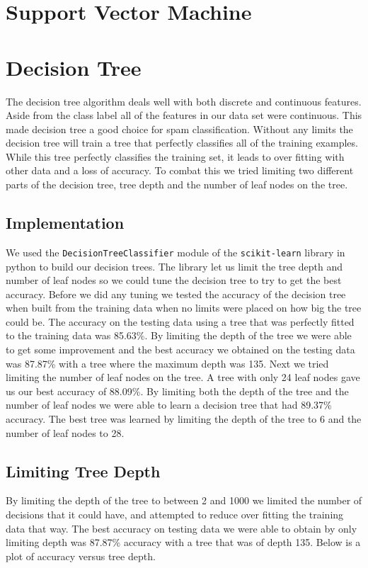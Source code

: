 \documentclass[10pt,letterpaper,onecolumn,draftclsnofoot]{IEEEtran}
\begin{document}
\section{Support Vector Machine}
\section{Decision Tree}
The decision tree algorithm deals well with both discrete and continuous features. Aside from the class label all of the features in our data set were continuous. This made decision tree a good choice for spam classification. Without any limits the decision tree will train a tree that perfectly classifies all of the training examples. While this tree perfectly classifies the training set, it leads to over fitting with other data and a loss of accuracy. To combat this we tried limiting two different parts of the decision tree, tree depth and the number of leaf nodes on the tree.

\subsection{Implementation}
We used the \texttt{DecisionTreeClassifier} module of the \texttt{scikit-learn} library in python to build our decision trees. The library let us limit the tree depth and number of leaf nodes so we could tune the decision tree to try to get the best accuracy. Before we did any tuning we tested the accuracy of the decision tree when built from the training data when no limits were placed on how big the tree could be. The accuracy on the testing data using a tree that was perfectly fitted to the training data was 85.63\%. By limiting the depth of the tree we were able to get some improvement and the best accuracy we obtained on the testing data was 87.87\% with a tree where the maximum depth was 135. Next we tried limiting the number of leaf nodes on the tree. A tree with only 24 leaf nodes gave us our best accuracy of 88.09\%. By limiting both the depth of the tree and the number of leaf nodes we were able to learn a decision tree that had 89.37\% accuracy. The best tree was learned by limiting the depth of the tree to 6 and the number of leaf nodes to 28.
 
\subsection{Limiting Tree Depth}
By limiting the depth of the tree to between 2 and 1000 we limited the number of decisions that it could have, and attempted to reduce over fitting the training data that way. The best accuracy on testing data we were able to obtain by only limiting depth was 87.87\% accuracy with a tree that was of depth 135. Below is a plot of accuracy versus tree depth.
\end{document}

